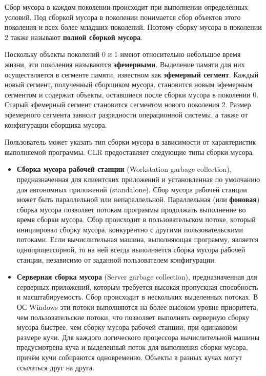Сбор мусора в каждом поколении происходит при выполнении определённых условий. Под сборкой мусора в поколении понимается сбор объектов этого поколения и всех более младших поколений. Поэтому сборку мусора в поколении 2 также называют \textbf{полной сборкой мусора}. \cite{dotnet_gc}

Поскольку объекты поколений 0 и 1 имеют относительно небольшое время жизни, эти поколения называются \textbf{эфемерными}. Выделение памяти для них осуществляется в сегменте памяти, известном как \textbf{эфемерный сегмент}. Каждый новый сегмент, полученный сборщиком мусора, становится новым эфемерным сегментом и содержит объекты, оставшиеся после сборки мусора в поколении 0. Старый эфемерный сегмент становится сегментом нового поколения 2. Размер эфемерного сегмента зависит разрядности операционной системы, а также от конфигурации сборщика мусора. \cite{dotnet_gc}

Пользователь может указать тип сборки мусора в зависимости от характеристик выполняемой программы. CLR предоставляет следующие типы сборки мусора. \cite{dotnet_gc_types}
\begin{itemize}[label*=---]
	\item \textbf{Сборка мусора рабочей станции} (Workstation garbage collection), предназначенная для клиентских приложений и установленная по умолчанию для автономных приложений (standalone). Сбор мусора рабочей станции может быть параллельной или непараллельной. Параллельная (или \textbf{фоновая}) сборка мусора позволяет потокам программы продолжать выполнение во время сборки мусора. Сбор происходит в пользовательском потоке, который инициировал сборку мусора, конкурентно с другими пользовательскими потоками. Если вычислительная машина, выполняющая программу, является однопроцессорной, то на ней всегда выполняется сборка мусора рабочей станции, независимо от заданной пользователем конфигурации.
	\item \textbf{Серверная сборка мусора} (Server garbage collection), предназначенная для серверных приложений, которым требуется высокая пропускная способность и масштабируемость. Сбор происходит в нескольких выделенных потоках. В ОС Windows эти потоки выполняются на более высоком уровне приоритета, чем пользовательские потоки, что позволяет выполнять серверную сборку мусора быстрее, чем сборку мусора рабочей станции, при одинаковом размере кучи. Для каждого логического процессора вычислительной машины предусмотрена куча и выделенный поток для выполнения сборки мусора, причём кучи собираются одновременно. Объекты в разных кучах могут ссылаться друг на друга.
\end{itemize}

